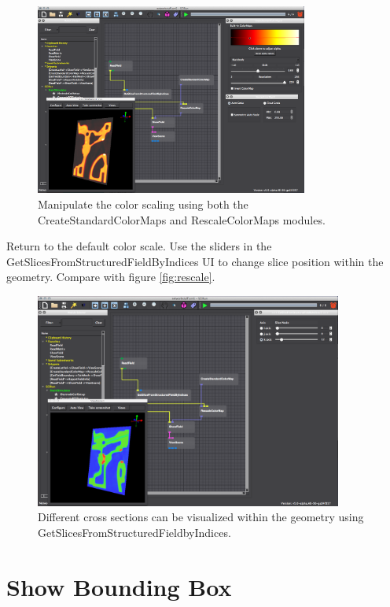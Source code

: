 \documentclass[fleqn,11pt,openany]{book}
\begin{document}
\begin{figure}[H]
\center
\includegraphics[width=0.8\textwidth]{BasicTutorial_figures/manipulatecolorscale.png}
\caption{Manipulate the color scaling using both the CreateStandardColorMaps and RescaleColorMaps modules.}
\label{fig:viewscene}
\end{figure}

Return to the default color scale. Use the sliders in the GetSlicesFromStructuredFieldByIndices UI
to change slice position within the geometry. Compare with figure \ref{fig:rescale}. 

\begin{figure}[H]
\center
\includegraphics[width=0.9\textwidth]{BasicTutorial_figures/sliceselect.png}
\caption{Different cross sections can be visualized within the geometry using GetSlicesFromStructuredFieldbyIndices. }
\label{fig:getslice}
\end{figure}


\section{Show Bounding Box}\label{bbox}
\end{document}
